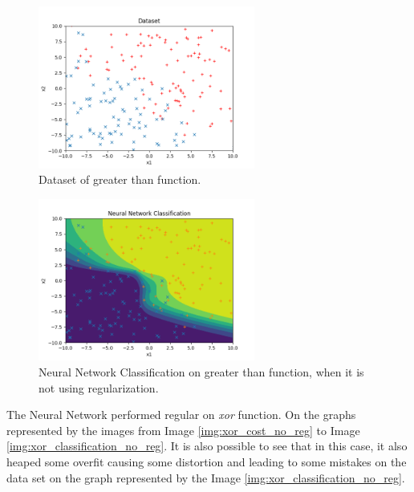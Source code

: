 \documentclass[journal]{IEEEtran}
\begin{document}
\begin{figure}
  \begin{center}
  \includegraphics[width=2.8in]{./../code/sgz_result/dataset_sgz_l0_0.png}
  \caption{Dataset of greater than function.}
  \label{img:greater_data_set}
  \end{center}
\end{figure}

\begin{figure}
    \begin{center}
    \includegraphics[width=2.8in]{./../code/sgz_result/nn_classification_sgz_l0_0.png}
    \caption{Neural Network Classification on greater than function, when it is not using regularization.}
    \label{img:greater_classification_no_reg}
    \end{center}
\end{figure}

The Neural Network performed regular on \textit{xor} function. On the graphs represented by the images from Image \ref{img:xor_cost_no_reg} to Image \ref{img:xor_classification_no_reg}. It is also possible to see that in this case, it also heaped some overfit causing some distortion and leading to some mistakes on the data set on the graph represented by the Image \ref{img:xor_classification_no_reg}.
\end{document}
